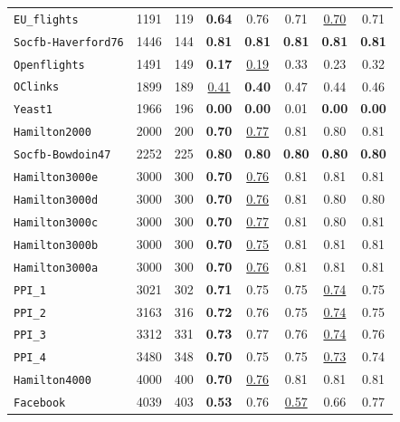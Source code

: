 \documentclass{article}
\begin{document}
\begin{table}[h]
\begin{minipage}{0.49\linewidth}
{\begin{tabular}{l|c|c|c|c|c|c|c}
            \texttt{EU\_flights} & 1191 & 119 & \textbf{0.64} & 0.76 & 0.71 & \underline{0.70} & 0.71 \\
            \texttt{Socfb-Haverford76} & 1446 & 144 & \textbf{0.81} & \textbf{0.81} & \textbf{0.81} & \textbf{0.81} & \textbf{0.81} \\
            \texttt{Openflights} & 1491 & 149 & \textbf{0.17} & \underline{0.19} & 0.33 & 0.23 & 0.32 \\
            \texttt{OClinks} & 1899 & 189 & \underline{0.41} & \textbf{0.40} & 0.47 & 0.44 & 0.46 \\
            \texttt{Yeast1} & 1966 & 196 & \textbf{0.00} & \textbf{0.00} & 0.01 & \textbf{0.00} & \textbf{0.00} \\
            \texttt{Hamilton2000} & 2000 & 200 & \textbf{0.70} & \underline{0.77} & 0.81 & 0.80 & 0.81 \\
            \texttt{Socfb-Bowdoin47} & 2252 & 225 & \textbf{0.80} & \textbf{0.80} & \textbf{0.80} & \textbf{0.80} & \textbf{0.80} \\
            \texttt{Hamilton3000e} & 3000 & 300 & \textbf{0.70} & \underline{0.76} & 0.81 & 0.81 & 0.81 \\
            \texttt{Hamilton3000d} & 3000 & 300 & \textbf{0.70} & \underline{0.76} & 0.81 & 0.80 & 0.80 \\
            \texttt{Hamilton3000c} & 3000 & 300 & \textbf{0.70} & \underline{0.77} & 0.81 & 0.80 & 0.81 \\
            \texttt{Hamilton3000b} & 3000 & 300 & \textbf{0.70} & \underline{0.75} & 0.81 & 0.81 & 0.81 \\
            \texttt{Hamilton3000a} & 3000 & 300 & \textbf{0.70} & \underline{0.76} & 0.81 & 0.81 & 0.81 \\
            \texttt{PPI\_1} & 3021 & 302 & \textbf{0.71} & 0.75 & 0.75 & \underline{0.74} & 0.75 \\
            \texttt{PPI\_2} & 3163 & 316 & \textbf{0.72} & 0.76 & 0.75 & \underline{0.74} & 0.75 \\
            \texttt{PPI\_3} & 3312 & 331 & \textbf{0.73} & 0.77 & 0.76 & \underline{0.74} & 0.76 \\
            \texttt{PPI\_4} & 3480 & 348 & \textbf{0.70} & 0.75 & 0.75 & \underline{0.73} & 0.74 \\
            \texttt{Hamilton4000} & 4000 & 400 & \textbf{0.70} & \underline{0.76} & 0.81 & 0.81 & 0.81 \\
            \texttt{Facebook} & 4039 & 403 & \textbf{0.53} & 0.76 & \underline{0.57} & 0.66 & 0.77 \\

\end{tabular}}
\end{minipage}
\end{table}
\end{document}
